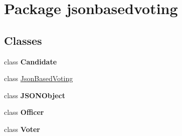 \hypertarget{namespacejsonbasedvoting}{}\section{Package jsonbasedvoting}
\label{namespacejsonbasedvoting}
\subsection*{Classes}
\begin{DoxyCompactItemize}
\item 
class {\bfseries Candidate}
\item 
class \mbox{\hyperlink{classjsonbasedvoting_1_1_json_based_voting}{Json\+Based\+Voting}}
\item 
class {\bfseries J\+S\+O\+N\+Object}
\item 
class {\bfseries Officer}
\item 
class {\bfseries Voter}
\end{DoxyCompactItemize}
